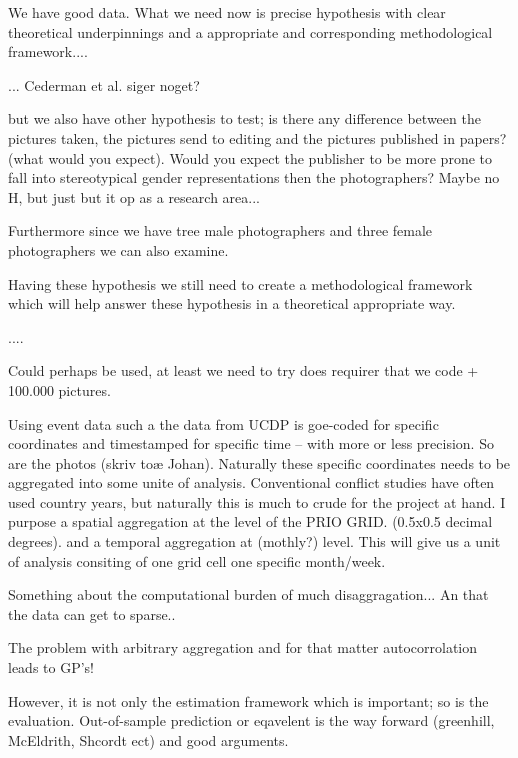 \documentclass[a4paper]{article}
\begin{document}
We have good data. What we need now is precise hypothesis with clear theoretical underpinnings and a appropriate and corresponding methodological framework....

... Cederman et al. siger noget?

but we also have other hypothesis to test; is there any difference between the pictures taken, the pictures send to editing and the pictures published in papers? (what would you expect). Would you expect the publisher to be more prone to fall into stereotypical gender representations then the photographers? Maybe no H, but just but it op as a research area...

Furthermore since we have tree male photographers and three female photographers we can also examine. 

Having these hypothesis we still need to create a methodological framework which will help answer these hypothesis in a theoretical appropriate way.

....

Could perhaps be used, at least we need to try does requirer that we code + 100.000 pictures.

Using event data such a the data from UCDP is goe-coded for specific coordinates and timestamped for specific time -- with more or less precision. So are the photos (skriv toæ Johan). Naturally these specific coordinates needs to be aggregated into some unite of analysis. Conventional conflict studies have often used country years, but naturally this is much to crude for the project at hand. I purpose a spatial aggregation at the level of the PRIO GRID. (0.5x0.5 decimal degrees). and a temporal aggregation at (mothly?) level. This will give us a unit of analysis consiting of one grid cell one specific month/week. 

Something about the computational burden of much disaggragation... An that the data can get to sparse..

The problem with arbitrary aggregation and for that matter autocorrolation leads to GP's!


However, it is not only the estimation framework which is important; so is the evaluation. Out-of-sample prediction or eqavelent is the way forward (greenhill, McEldrith, Shcordt ect) and good arguments.
\end{document}
